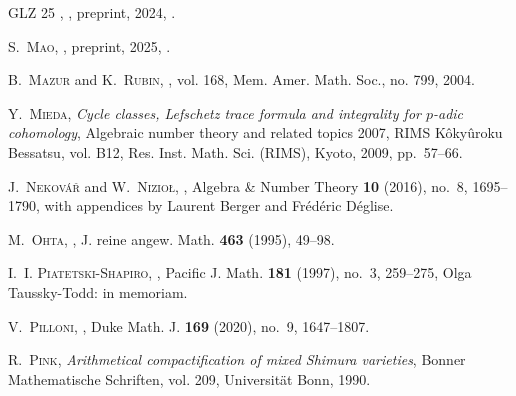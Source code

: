 \documentclass[cjm]{ipart}
\theoremstyle{plain}
\theoremstyle{remark}
\numberwithin{equation}{subsection}
\begin{document}
\begin{thebibliography}{GLZ 25}
\bysame, , preprint, 2024,
  .

\textsc{S.~Mao},
  , preprint, 2025, .

\textsc{B.~Mazur} and \textsc{K.~Rubin},
  ,
  vol. 168, Mem. Amer. Math. Soc., no. 799, 2004. 

\textsc{Y.~Mieda}, \emph{Cycle classes, {L}efschetz trace formula and
  integrality for {$p$}-adic cohomology}, Algebraic number theory and related
  topics 2007, RIMS K{\^o}ky{\^u}roku Bessatsu, vol. B12, Res. Inst. Math. Sci.
  (RIMS), Kyoto, 2009, pp.~57--66. 

\textsc{J.~Nekov{\'a}{\v{r}}} and \textsc{W.~Nizio{\l}},
  ,
  Algebra \& Number Theory \textbf{10} (2016), no.~8, 1695--1790, with
  appendices by Laurent Berger and Fr\'ed\'eric D\'eglise. 

\textsc{M.~Ohta},
  , J. reine
  angew. Math. \textbf{463} (1995), 49--98. 

\textsc{I.~I. Piatetski-Shapiro},
  , Pacific J. Math. \textbf{181} (1997), no.~3,
  259--275, Olga Taussky-Todd: in memoriam. 

\textsc{V.~Pilloni},
  , Duke Math. J.
  \textbf{169} (2020), no.~9, 1647--1807. 

\textsc{R.~Pink}, \emph{Arithmetical compactification of mixed {S}himura
  varieties}, Bonner Mathematische Schriften, vol. 209, Universit\"at Bonn,
  1990. 


\end{thebibliography}
\end{document}
